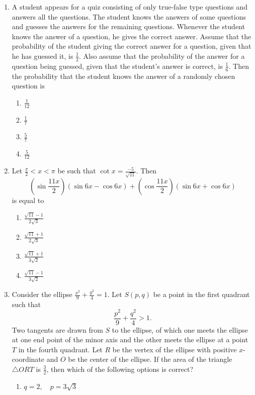 \documentclass[12pt,a4paper]{article}
\begin{document}
\begin{enumerate}
    \item A student appears for a quiz consisting of only true-false type questions and answers all the questions. The student knows the answers of some questions and guesses the answers for the remaining questions. Whenever the student knows the answer of a question, he gives the correct answer. Assume that the probability of the student giving the correct answer for a question, given that he has guessed it, is $\frac{1}{2}$. Also assume that the probability of the answer for a question being guessed, given that the student’s answer is correct, is $\frac{1}{6}$. Then the probability that the student knows the answer of a randomly chosen question is 
    \begin{enumerate}
        \item $\frac{1}{12}$
        \item $\frac{1}{7}$
        \item $\frac{5}{7}$
        \item $\frac{5}{12}$
    \end{enumerate}
\item Let \( \frac{\pi}{2} < x < \pi \) be such that \( \cot x = \frac{-5}{\sqrt{11}} \). Then 
    \[
    \left( \sin \frac{11x}{2} \right) (\sin 6x - \cos 6x) + \left( \cos \frac{11x}{2} \right) (\sin 6x + \cos 6x)
    \]
    is equal to
    \begin{enumerate}
        \item \( \frac{\sqrt{11} - 1}{2\sqrt{3}} \)
        \item \( \frac{\sqrt{11} + 1}{2\sqrt{3}} \)
        \item \( \frac{\sqrt{11} + 1}{3\sqrt{2}} \)
        \item \( \frac{\sqrt{11} - 1}{3\sqrt{2}} \)
    \end{enumerate}
\item Consider the ellipse \( \frac{x^2}{9} + \frac{y^2}{4} = 1 \). Let \( S(p, q) \) be a point in the first quadrant such that 
    \[
    \frac{p^2}{9} + \frac{q^2}{4} > 1.
    \]
    Two tangents are drawn from \( S \) to the ellipse, of which one meets the ellipse at one end point of the minor axis and the other meets the ellipse at a point \( T \) in the fourth quadrant. Let \( R \) be the vertex of the ellipse with positive \( x \)-coordinate and \( O \) be the center of the ellipse. If the area of the triangle \( \triangle ORT \) is \( \frac{3}{2} \), then which of the following options is correct?
    \begin{enumerate}
        \item \( q = 2, \quad p = 3\sqrt{3} \)

\end{enumerate}
\end{enumerate}
\end{document}
